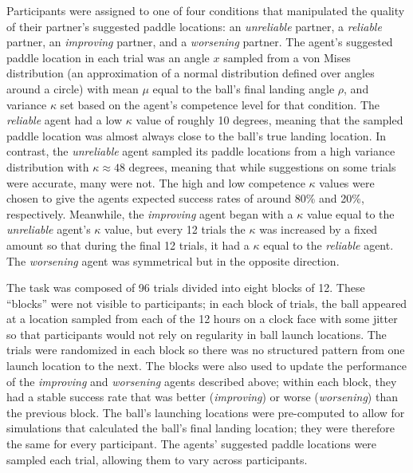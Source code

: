 \documentclass[10pt,letterpaper]{article}
\begin{document}
Participants were assigned to one of four conditions that manipulated the quality of their partner's suggested paddle locations: an \textit{unreliable} partner, a \textit{reliable} partner, an \textit{improving} partner, and a \textit{worsening} partner. The agent's
suggested paddle location in each trial was an angle $x$ sampled from a von Mises distribution (an approximation of a normal distribution defined over angles around a circle) with mean $\mu$ equal to the ball's final landing angle $\rho$, and variance $\kappa$ set based on the agent's competence level for that condition. The \textit{reliable} agent had a low $\kappa$ value of roughly 10 degrees, meaning that the sampled paddle location was almost always close to the ball's true landing location. In contrast, the \textit{unreliable} agent sampled its paddle locations from a high variance distribution with $\kappa \approx 48$ degrees, meaning that while suggestions on some trials were accurate, many were not. The high and low competence $\kappa$ values were chosen to give the agents expected success rates of around 80\% and 20\%, respectively. Meanwhile, the \textit{improving} agent began with a $\kappa$ value equal to the \textit{unreliable} agent's $\kappa$ value, but every 12 trials the $\kappa$ was increased by a fixed amount so that during the final 12 trials, it had a $\kappa$ equal to the \textit{reliable} agent. The \textit{worsening} agent was symmetrical but in the opposite direction.

The task was composed of 96 trials divided into eight blocks of 12. These ``blocks'' were not visible to participants; in each block of trials, the ball appeared at a location sampled from each of the 12 hours on a clock face with some jitter so that participants would not rely on regularity in ball launch locations. The trials were randomized in each block so there was no structured pattern from one launch location to the next. The blocks were also used to update the performance of the \textit{improving} and \textit{worsening} agents described above; within each block, they had a stable success rate that was better (\textit{improving}) or worse (\textit{worsening}) than the previous block. The ball's launching locations were pre-computed to allow for simulations that calculated the ball's final landing location; they were therefore the same for every participant. The agents' suggested paddle locations were sampled each trial, allowing them to vary across participants. 
\end{document}
